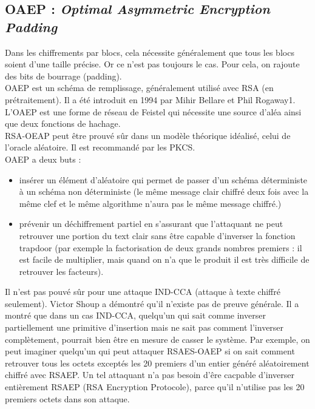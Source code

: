 \subsection{OAEP : \textit{Optimal Asymmetric Encryption Padding}}
Dans les chiffrements par blocs, cela nécessite généralement que tous les blocs soient d'une taille précise. Or ce n'est pas toujours le cas. Pour cela, on rajoute des bits de bourrage (padding).\\
OAEP est un schéma de remplissage, généralement utilisé avec RSA (en prétraitement). Il a été introduit en 1994 par Mihir Bellare et Phil Rogaway1. L'OAEP est une forme de réseau de Feistel qui nécessite une source d'aléa ainsi que deux fonctions de hachage.\\
RSA-OEAP peut être prouvé sûr dans un modèle théorique idéalisé, celui de l'oracle aléatoire. Il est recommandé par les PKCS.\\
OAEP a deux buts : 
\begin{itemize}
	\item insérer un élément d'aléatoire qui permet de passer d'un schéma déterministe à un schéma non déterministe (le même message clair chiffré deux fois avec la même clef et le même algorithme n'aura pas le même message chiffré.)
	\item prévenir un déchiffrement partiel en s'assurant que l'attaquant ne peut retrouver une portion du text clair sans être capable d'inverser la fonction trapdoor (par exemple la factorisation de deux grands nombres premiers : il est facile de multiplier, mais quand on n'a que le produit  il est très difficile de retrouver les facteurs).\\
\end{itemize}
Il n'est pas pouvé sûr pour une attaque IND-CCA (attaque à texte chiffré seulement). Victor Shoup a démontré qu'il n'existe pas de preuve générale.
Il a montré que dans un cas IND-CCA, quelqu'un qui sait comme inverser partiellement une primitive d'insertion mais ne sait pas comment l'inverser complètement, pourrait bien être en mesure de casser le système. Par exemple, on peut imaginer quelqu'un qui peut attaquer RSAES-OAEP si on sait comment retrouver tous les octets exceptés les 20 premiers d'un entier généré aléatoirement chiffré avec RSAEP. Un tel attaquant n'a pas besoin d'êre cacpable d'inverser entièrement RSAEP (RSA Encryption Protocole), parce qu'il n'utilise pas les 20 premiers octets dans son attaque.

